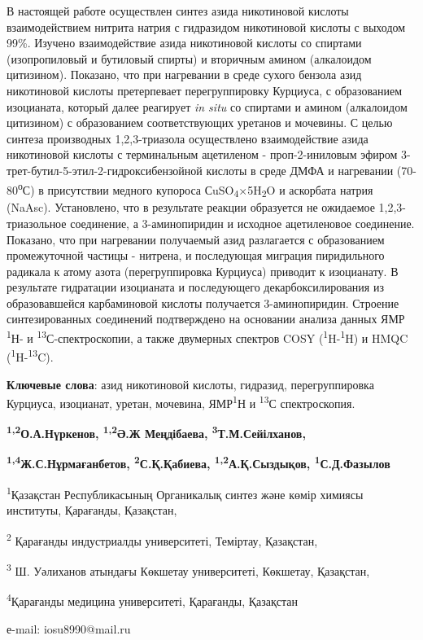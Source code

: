 В настоящей работе осуществлен синтез азида никотиновой кислоты
взаимодействием нитрита натрия с гидразидом никотиновой кислоты с
выходом 99\%. Изучено взаимодействие азида никотиновой кислоты со
спиртами (изопропиловый и бутиловый спирты) и вторичным амином
(алкалоидом цитизином). Показано, что при нагревании в среде сухого
бензола азид никотиновой кислоты претерпевает перегруппировку Курциуса,
с образованием изоцианата, который далее реагирует \emph{in situ} со
спиртами и амином (алкалоидом цитизином) с образованием соответствующих
уретанов и мочевины. С целью синтеза производных 1,2,3-триазола
осуществлено взаимодействие азида никотиновой кислоты с терминальным
ацетиленом - проп-2-иниловым эфиром
3-трет-бутил-5-этил-2-гидроксибензойной кислоты в среде ДМФА и
нагревании (70-80\textsuperscript{о}С) в присутствии медного купороса
СuSO\textsubscript{4}×5H\textsubscript{2}O и аскорбата натрия (NaAsc).
Установлено, что в результате реакции образуется не ожидаемое
1,2,3-триазольное соединение, а 3-аминопиридин и исходное ацетиленовое
соединение. Показано, что при нагревании получаемый азид разлагается с
образованием промежуточной частицы - нитрена, и последующая миграция
пиридильного радикала к атому азота (перегруппировка Курциуса) приводит
к изоцианату. В результате гидратации изоцианата и последующего
декарбоксилирования из образовавшейся карбаминовой кислоты получается
3-аминопиридин. Строение синтезированных соединений подтверждено на
основании анализа данных ЯМР \textsuperscript{1}Н- и
\textsuperscript{13}С-спектроскопии, а также двумерных спектров COSY
(\textsuperscript{1}H-\textsuperscript{1}H) и HMQC
(\textsuperscript{1}H-\textsuperscript{13}C).

{\bfseries Ключевые слова}: азид никотиновой кислоты, гидразид,
перегруппировка Курциуса, изоцианат, уретан, мочевина,
ЯМР\textsuperscript{1}Н и \textsuperscript{13}С спектроскопия.


\begin{center}
{\bfseries \textsuperscript{1,2}О.А.Нүркенов, \textsuperscript{1,2}Ә.Ж
Меңдібаева, \textsuperscript{3}Т.М.Сейілханов,}

{\bfseries \textsuperscript{1,4}Ж.С.Нұрмағанбетов,
\textsuperscript{2}С.Қ.Қабиева, \textsuperscript{1,2}А.Қ.Сыздықов,
\textsuperscript{1}С.Д.Фазылов\envelope}

\textsuperscript{1}Қазақстан Республикасының Органикалық синтез және
көмір химиясы институты, Қарағанды, Қазақстан,

\textsuperscript{2} Қарағанды индустриалды университеті, Теміртау,
Қазақстан,

\textsuperscript{3} Ш. Уәлиханов атындағы Көкшетау университеті,
Көкшетау, Қазақстан,

\textsuperscript{4}Қарағанды медицина университеті, Қарағанды, Қазақстан

е-mail: iosu8990@mail.ru
\end{center}

